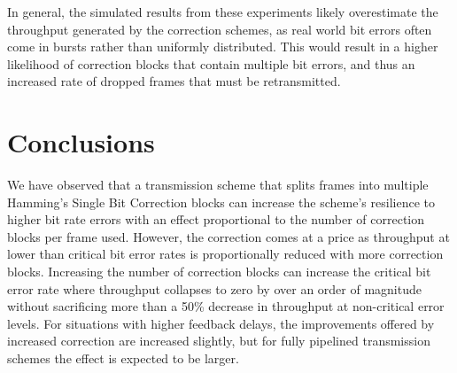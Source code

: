 \documentclass[twocolumn]{article}
\begin{document}
    In general, the simulated results from these experiments likely overestimate the throughput
    generated by the correction schemes, as real world bit errors often come in bursts rather
    than uniformly distributed. This would result in a higher likelihood of correction blocks
    that contain multiple bit errors, and thus an increased rate of dropped frames that 
    must be retransmitted.

\section*{Conclusions}

    We have observed that a transmission scheme that splits frames into multiple Hamming's 
    Single Bit Correction blocks can increase the scheme's resilience to higher bit rate 
    errors with an effect proportional to the number of correction blocks per frame used. 
    However, the correction comes at a price as throughput at lower than critical bit error
    rates is proportionally reduced with more correction blocks. Increasing the number of 
    correction blocks can increase the critical bit error rate where throughput collapses 
    to zero by 
    over an order of magnitude without sacrificing more than a 50\% decrease in throughput
    at non-critical error levels. For situations with higher feedback delays, the improvements
    offered by increased correction are
    increased slightly, but for fully pipelined transmission schemes the effect is expected 
    to be larger.
\end{document}
